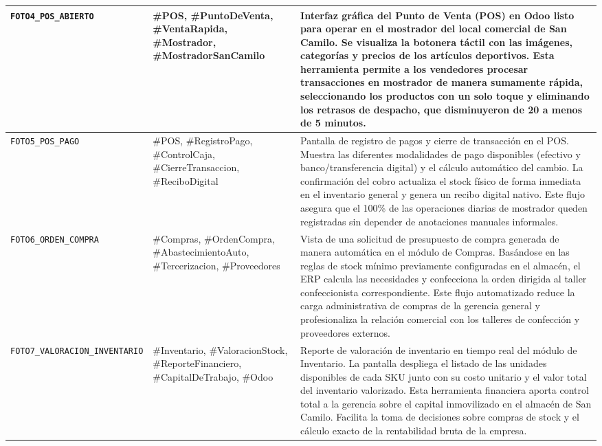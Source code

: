 \documentclass[11pt,a4paper]{article}
\begin{document}
\begin{longtable}{|>{\centering\arraybackslash}m{}|>{\RaggedRight\arraybackslash}m{}|>{\RaggedRight\arraybackslash}m{}|}
\texttt{FOTO4\_POS\_ABIERTO}
&
\#POS, \#PuntoDeVenta, \#VentaRapida, \#Mostrador, \#MostradorSanCamilo
&
Interfaz gráfica del Punto de Venta (POS) en Odoo listo para operar en el mostrador del local comercial de San Camilo. Se visualiza la botonera táctil con las imágenes, categorías y precios de los artículos deportivos. Esta herramienta permite a los vendedores procesar transacciones en mostrador de manera sumamente rápida, seleccionando los productos con un solo toque y eliminando los retrasos de despacho, que disminuyeron de 20 a menos de 5 minutos.
\\ \hline

\texttt{FOTO5\_POS\_PAGO}
&
\#POS, \#RegistroPago, \#ControlCaja, \#CierreTransaccion, \#ReciboDigital
&
Pantalla de registro de pagos y cierre de transacción en el POS. Muestra las diferentes modalidades de pago disponibles (efectivo y banco/transferencia digital) y el cálculo automático del cambio. La confirmación del cobro actualiza el stock físico de forma inmediata en el inventario general y genera un recibo digital nativo. Este flujo asegura que el 100\% de las operaciones diarias de mostrador queden registradas sin depender de anotaciones manuales informales.
\\ \hline

\texttt{FOTO6\_ORDEN\_COMPRA}
&
\#Compras, \#OrdenCompra, \#AbastecimientoAuto, \#Tercerizacion, \#Proveedores
&
Vista de una solicitud de presupuesto de compra generada de manera automática en el módulo de Compras. Basándose en las reglas de stock mínimo previamente configuradas en el almacén, el ERP calcula las necesidades y confecciona la orden dirigida al taller confeccionista correspondiente. Este flujo automatizado reduce la carga administrativa de compras de la gerencia general y profesionaliza la relación comercial con los talleres de confección y proveedores externos.
\\ \hline

\texttt{FOTO7\_VALORACION\_INVENTARIO}
&
\#Inventario, \#ValoracionStock, \#ReporteFinanciero, \#CapitalDeTrabajo, \#Odoo
&
Reporte de valoración de inventario en tiempo real del módulo de Inventario. La pantalla despliega el listado de las unidades disponibles de cada SKU junto con su costo unitario y el valor total del inventario valorizado. Esta herramienta financiera aporta control total a la gerencia sobre el capital inmovilizado en el almacén de San Camilo. Facilita la toma de decisiones sobre compras de stock y el cálculo exacto de la rentabilidad bruta de la empresa.
\\ \hline


\end{longtable}
\end{document}
